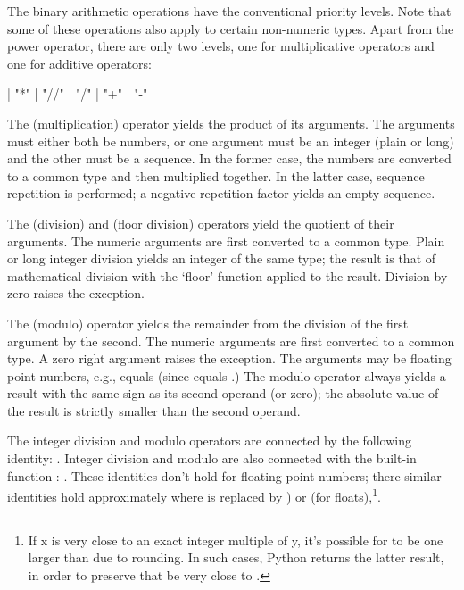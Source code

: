 The binary arithmetic operations have the conventional priority
levels.  Note that some of these operations also apply to certain
non-numeric types.  Apart from the power operator, there are only two
levels, one for multiplicative operators and one for additive
operators:

\begin{productionlist}
             { |  "*" 
              |  "//" 
              |  "/" }
             { |  "+" 
              |  "-" }
\end{productionlist}

The \code{*} (multiplication) operator yields the product of its
arguments.  The arguments must either both be numbers, or one argument
must be an integer (plain or long) and the other must be a sequence.
In the former case, the numbers are converted to a common type and
then multiplied together.  In the latter case, sequence repetition is
performed; a negative repetition factor yields an empty sequence.

The \code{/} (division) and \code{//} (floor division) operators yield
the quotient of their arguments.  The numeric arguments are first
converted to a common type.  Plain or long integer division yields an
integer of the same type; the result is that of mathematical division
with the `floor' function applied to the result.  Division by zero
raises the
 exception.

The \code{\%} (modulo) operator yields the remainder from the
division of the first argument by the second.  The numeric arguments
are first converted to a common type.  A zero right argument raises
the  exception.  The arguments may be floating
point numbers, e.g.,  equals  (since
 equals .)  The modulo operator always
yields a result with the same sign as its second operand (or zero);
the absolute value of the result is strictly smaller than the second
operand.

The integer division and modulo operators are connected by the
following identity: .  Integer division and
modulo are also connected with the built-in function :
.  These identities don't hold for
floating point numbers; there similar identities hold
approximately where  is replaced by ) or
 (for floats),\footnote{
    If x is very close to an exact integer multiple of y, it's
    possible for  to be one larger than
     due to rounding.  In such cases, Python returns
    the latter result, in order to preserve that  be very close to .
}.

